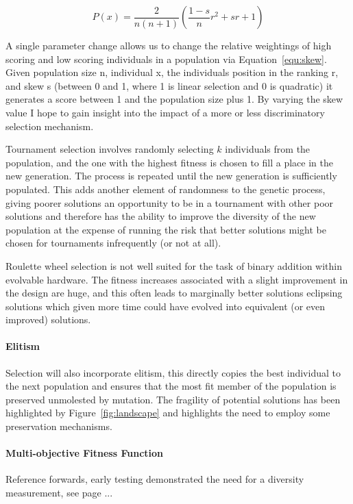 \begin{equation}
	\label{equ:skew}
	P(x) = \frac{2}{n(n+1)} (\frac{1-s}{n}r^2 + sr + 1)
\end{equation}

A single parameter change allows us to change the relative weightings of high scoring
and low scoring individuals in a population via Equation~\ref{equ:skew}. Given
population size n, individual x, the individuals position in the ranking r, and
skew s (between 0 and 1, where 1 is linear selection and 0 is quadratic) it
generates a score between 1 and the population size plus 1. By varying the skew
value I hope to gain insight into the impact of a more or less discriminatory
selection mechanism.

Tournament selection involves randomly selecting $k$ individuals from the
population, and the one with the highest fitness is chosen to fill a place
in the new generation. The process is repeated until the new generation is
sufficiently populated. This adds another element of randomness to the
genetic process, giving poorer solutions an opportunity to be in a tournament
with other poor solutions and therefore has the ability to improve the
diversity of the new population at the expense of running the risk that
better solutions might be chosen for tournaments infrequently (or not at
all).

Roulette wheel selection is not well suited for the task of binary addition
within evolvable hardware. The fitness increases associated with a slight
improvement in the design are huge, and this often leads to marginally better
solutions eclipsing solutions which given more time could have evolved into
equivalent (or even improved) solutions.

\paragraph{Elitism}

Selection will also incorporate elitism, this directly copies the best individual
to the next population and ensures that the most fit member
of the population is preserved unmolested by mutation. The fragility of potential
solutions has been highlighted by Figure~\ref{fig:landscape} and highlights the
need to employ some preservation mechanisms.

\paragraph{Multi-objective Fitness Function}
\todo Reference forwards, early testing demonstrated the need for a diversity
measurement, see page ...

